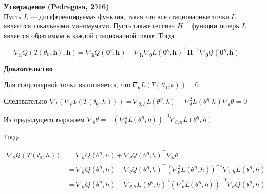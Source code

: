 \documentclass[]{article}
\date{}
\begin{document}
\textbf{Утверждение (Pedregosa, 2016)}\\
Пусть \(L\) --- дифференцируемая функция, такая что все стационарные
точки \(L\) являются локальными минимумами. Пусть также гессиан
\(H^{−1}\) функции потерь \(L\) является обратимым в каждой стационарной
точке. Тогда

\[\nabla_{\mathrm{h}} Q\left(T\left(\theta_{0}, \mathbf{h}\right), \mathbf{h}\right)=\nabla_{\mathbf{h}} Q\left(\boldsymbol{\theta}^{\eta}, \mathbf{h}\right)-\nabla_{\mathbf{h}} \nabla_{\boldsymbol{\theta}} L\left(\boldsymbol{\theta}^{\eta}, \mathbf{h}\right)^{\top} \mathbf{H}^{-1} \nabla_{\boldsymbol{\theta}} Q\left(\boldsymbol{\theta}^{\eta}, \mathbf{h}\right)\]

\textbf{Доказательство}

Для стационарной точки выполняется, что
\(\nabla_{\theta} L(T(\theta_{0}, h))=0\)

Следовательно
\(\nabla_{h}\left(\nabla_{\theta} L\left(T\left(\theta_{0}, h\right)\right)\right)= \nabla_{\theta, h} L\left(\theta^{\eta}, h\right)+\nabla_{\theta}^{2} L\left(\theta^{\eta}, h\right) \nabla_h \theta=0\)

Из предыдущего выражаем
\( \nabla_h \theta = -\left(\nabla_{\theta}^{2} L\left(\theta^{\eta}, h\right)\right)^{-1} \nabla_{\theta, h} L\left(\theta^{\eta}, h\right)\)

Тогда

\(\begin{array}{l} \nabla_h Q\left(T\left(\theta_{0}, h\right)\right) &= \nabla_{h} Q\left(\theta^{\eta}, h\right)+\nabla_{\theta} Q\left(\theta^{\eta}, h\right)^{\top} \nabla_h \theta \\&= \nabla_{h} Q\left(\theta^{\eta}, h\right)-\nabla_{\theta} Q\left(\theta^{\eta}, h\right)^{\top}\left(\nabla_{\theta}^{2} L\left(\theta^{\eta}, h\right)\right)^{-1} \nabla_{\theta, h} L\left(\theta^{\eta}, h\right) \\ &= \nabla_{h} Q \left(\theta^{\eta}, h\right)-\nabla_{\theta, h} L\left(\theta^{\eta}, h\right)^{\top}\left(\nabla_{\theta}^{2} L\left(\theta^{\eta}, h\right)\right)^{-1} \nabla_{\theta} Q\left(\theta^{\eta}, h\right)\end{array}\)
\end{document}
